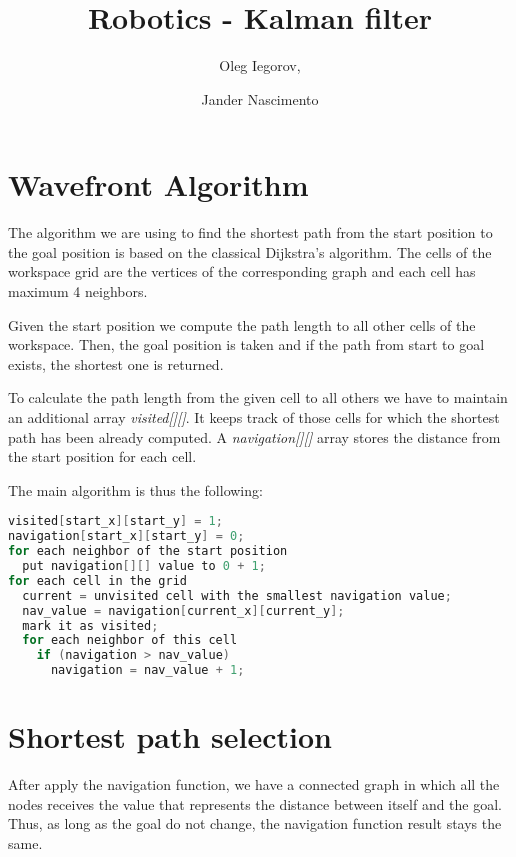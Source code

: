 \documentclass{article}
\begin{document}
\title{Robotics - Kalman filter}

\author{Oleg Iegorov, 
\and Jander Nascimento}

\maketitle

\section{Wavefront Algorithm}

The algorithm we are using to find the shortest path from the start
position to the goal position is based on the classical Dijkstra's
algorithm. The cells of the workspace grid are the vertices of the
corresponding graph and each cell has maximum 4 neighbors.

Given the start position we compute the path length to all other cells
of the workspace. Then, the goal position is taken and if the path from
start to goal exists, the shortest one is returned.

To calculate the path length from the given cell to all others we have
to maintain an additional array \emph{visited[][]}. It keeps track of
those cells for which the shortest path has been already computed.  A
\emph{navigation[][]} array stores the distance from the start position for
each cell.

The main algorithm is thus the following:

\begin{lstlisting}[language=C]
visited[start_x][start_y] = 1;
navigation[start_x][start_y] = 0;
for each neighbor of the start position
  put navigation[][] value to 0 + 1;
for each cell in the grid
  current = unvisited cell with the smallest navigation value;
  nav_value = navigation[current_x][current_y];
  mark it as visited;
  for each neighbor of this cell
    if (navigation > nav_value)
      navigation = nav_value + 1;
\end{lstlisting}


\section{Shortest path selection}

After apply the navigation function, we have a connected graph in which all the nodes receives the value that represents the distance between itself and the goal. Thus, as long as the goal do not change, the navigation function result stays the same.
 
\end{document}
